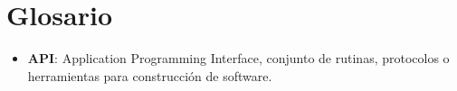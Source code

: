 \newpage
\section*{Glosario}
\begin{itemize}
  \item \textbf{API}: Application Programming Interface, conjunto de rutinas, protocolos o herramientas para construcción de software.
  
\end{itemize}
